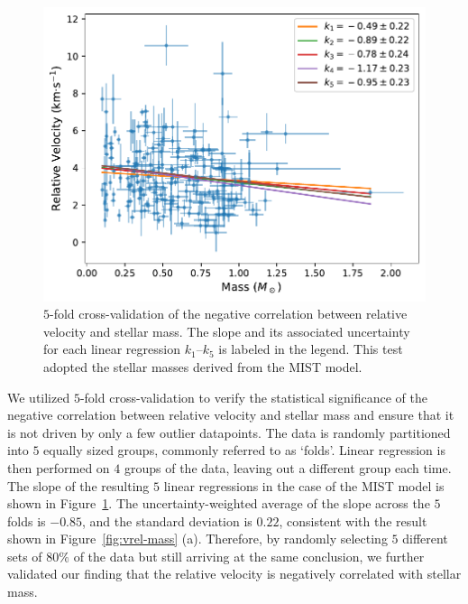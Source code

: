 \documentclass[12pt]{ucsddissertation}
\begin{document}
\begin{CJK*}{UTF8}{gbsn}
\begin{figure}[htb!]
    \centering
    \includegraphics[width=0.7\linewidth]{figures/chapter1/KFold.pdf}
    \caption[Cross validation of negative correlation between relative velocity and stellar mass]{$5$-fold cross-validation of the negative correlation between relative velocity and stellar mass. The slope and its associated uncertainty for each linear regression $k_1$--$k_5$ is labeled in the legend. This test adopted the stellar masses derived from the MIST model.}
    \label{fig:kfold}
\end{figure}

We utilized $5$-fold cross-validation to verify the statistical significance of the negative correlation between relative velocity and stellar mass and ensure that it is not driven by only a few outlier datapoints. The data is randomly partitioned into $5$ equally sized groups, commonly referred to as `folds'. Linear regression is then performed on $4$ groups of the data, leaving out a different group each time. The slope of the resulting $5$ linear regressions in the case of the MIST model is shown in Figure~\ref{fig:kfold}. The uncertainty-weighted average of the slope across the $5$ folds is $-0.85$, and the standard deviation is $0.22$, consistent with the result shown in Figure~\ref{fig:vrel-mass} (a). Therefore, by randomly selecting $5$ different sets of $80\%$ of the data but still arriving at the same conclusion, we further validated our finding that the relative velocity is negatively correlated with stellar mass.


\end{CJK*}
\end{document}
